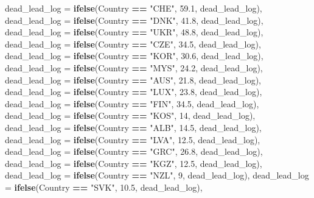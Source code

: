 \documentclass[
]{article}
\newenvironment{Shaded}{\begin{snugshade}}{\end{snugshade}}
\newcommand{\DataTypeTok}[1]{\textcolor[rgb]{0.13,0.29,0.53}{#1}}
\newcommand{\DecValTok}[1]{\textcolor[rgb]{0.00,0.00,0.81}{#1}}
\newcommand{\FloatTok}[1]{\textcolor[rgb]{0.00,0.00,0.81}{#1}}
\newcommand{\KeywordTok}[1]{\textcolor[rgb]{0.13,0.29,0.53}{\textbf{#1}}}
\newcommand{\NormalTok}[1]{#1}
\newcommand{\OperatorTok}[1]{\textcolor[rgb]{0.81,0.36,0.00}{\textbf{#1}}}
\newcommand{\StringTok}[1]{\textcolor[rgb]{0.31,0.60,0.02}{#1}}
\begin{document}
\begin{Shaded}
\begin{Highlighting}[]
{{         \DataTypeTok{dead_lead_log =} \KeywordTok{ifelse}\NormalTok{(Country }\OperatorTok{==}\StringTok{ "CHE"}\NormalTok{, }\FloatTok{59.1}\NormalTok{, dead_lead_log),}
         \DataTypeTok{dead_lead_log =} \KeywordTok{ifelse}\NormalTok{(Country }\OperatorTok{==}\StringTok{ "DNK"}\NormalTok{, }\FloatTok{41.8}\NormalTok{, dead_lead_log),}
         \DataTypeTok{dead_lead_log =} \KeywordTok{ifelse}\NormalTok{(Country }\OperatorTok{==}\StringTok{ "UKR"}\NormalTok{, }\FloatTok{48.8}\NormalTok{, dead_lead_log),}
         \DataTypeTok{dead_lead_log =} \KeywordTok{ifelse}\NormalTok{(Country }\OperatorTok{==}\StringTok{ "CZE"}\NormalTok{, }\FloatTok{34.5}\NormalTok{, dead_lead_log),}
         \DataTypeTok{dead_lead_log =} \KeywordTok{ifelse}\NormalTok{(Country }\OperatorTok{==}\StringTok{ "KOR"}\NormalTok{, }\FloatTok{30.6}\NormalTok{, dead_lead_log),}
         \DataTypeTok{dead_lead_log =} \KeywordTok{ifelse}\NormalTok{(Country }\OperatorTok{==}\StringTok{ "MYS"}\NormalTok{, }\FloatTok{24.2}\NormalTok{, dead_lead_log),}
         \DataTypeTok{dead_lead_log =} \KeywordTok{ifelse}\NormalTok{(Country }\OperatorTok{==}\StringTok{ "AUS"}\NormalTok{, }\FloatTok{21.8}\NormalTok{, dead_lead_log),}
         \DataTypeTok{dead_lead_log =} \KeywordTok{ifelse}\NormalTok{(Country }\OperatorTok{==}\StringTok{ "LUX"}\NormalTok{, }\FloatTok{23.8}\NormalTok{, dead_lead_log),}
         \DataTypeTok{dead_lead_log =} \KeywordTok{ifelse}\NormalTok{(Country }\OperatorTok{==}\StringTok{ "FIN"}\NormalTok{, }\FloatTok{34.5}\NormalTok{, dead_lead_log),}
         \DataTypeTok{dead_lead_log =} \KeywordTok{ifelse}\NormalTok{(Country }\OperatorTok{==}\StringTok{ "KOS"}\NormalTok{, }\DecValTok{14}\NormalTok{, dead_lead_log),}
         \DataTypeTok{dead_lead_log =} \KeywordTok{ifelse}\NormalTok{(Country }\OperatorTok{==}\StringTok{ "ALB"}\NormalTok{, }\FloatTok{14.5}\NormalTok{, dead_lead_log),}
         \DataTypeTok{dead_lead_log =} \KeywordTok{ifelse}\NormalTok{(Country }\OperatorTok{==}\StringTok{ "LVA"}\NormalTok{, }\FloatTok{12.5}\NormalTok{, dead_lead_log),}
         \DataTypeTok{dead_lead_log =} \KeywordTok{ifelse}\NormalTok{(Country }\OperatorTok{==}\StringTok{ "GRC"}\NormalTok{, }\FloatTok{26.8}\NormalTok{, dead_lead_log),}
         \DataTypeTok{dead_lead_log =} \KeywordTok{ifelse}\NormalTok{(Country }\OperatorTok{==}\StringTok{ "KGZ"}\NormalTok{, }\FloatTok{12.5}\NormalTok{, dead_lead_log),}
         \DataTypeTok{dead_lead_log =} \KeywordTok{ifelse}\NormalTok{(Country }\OperatorTok{==}\StringTok{ "NZL"}\NormalTok{, }\DecValTok{9}\NormalTok{, dead_lead_log),}
         \DataTypeTok{dead_lead_log =} \KeywordTok{ifelse}\NormalTok{(Country }\OperatorTok{==}\StringTok{ "SVK"}\NormalTok{, }\FloatTok{10.5}\NormalTok{, dead_lead_log),}
}}
\end{Highlighting}
\end{Shaded}
\end{document}
